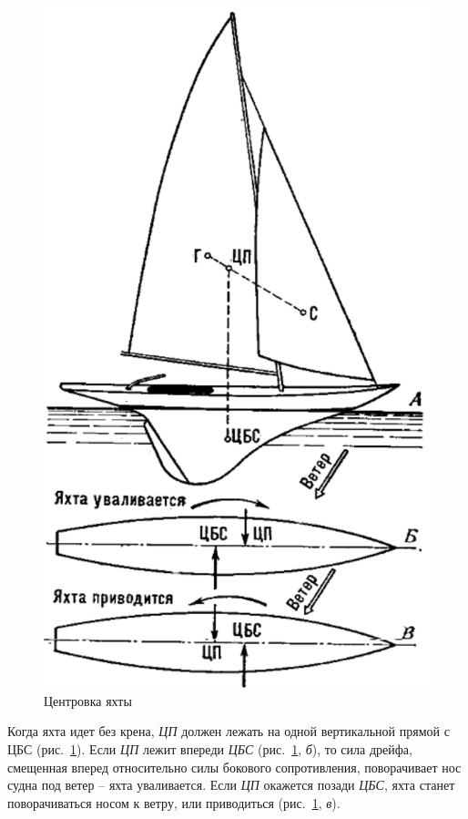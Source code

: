 \documentclass[a4paper, 12pt, twoside, final]{scrbook}
\begin{document}
\begin{figure}[htbp]
   \centering
   \includegraphics{99_Centrovka_yakhty} %
   \caption{Центровка яхты}
   \label{fig:99}
\end{figure}

Когда яхта идет без крена, \textit{ЦП} должен лежать на одной вертикальной прямой с ЦБС (рис.~\ref{fig:99}). Если \textit{ЦП} лежит впереди \textit{ЦБС} (рис.~\ref{fig:99}, \textit{б}), то сила дрейфа, смещенная вперед относительно силы бокового сопротивления, поворачивает нос судна под ветер \--- яхта уваливается. Если \textit{ЦП} окажется позади \textit{ЦБС}, яхта станет поворачиваться носом к ветру, или приводиться (рис.~\ref{fig:99}, \textit{в}).
\end{document}
